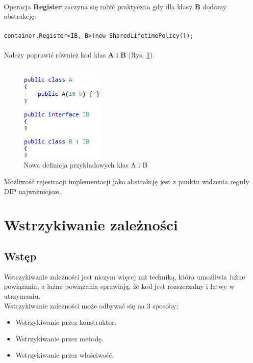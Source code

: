 \documentclass[12pt]{article}
\begin{document}
\\
Operacja \textbf{Register} zaczyna się robić praktyczna gdy dla klasy \textbf{B} dodamy abstrakcję: \\
\\
\texttt{container.Register<IB, B>(new SharedLifetimePolicy());}\\
\\
Należy poprawić również kod klas \textbf{A} i \textbf{B} (Rys. \ref{fig:Example_Container2}). \\ \\
\begin{figure}[H]
	\begin{center}
  		\includegraphics{Example_Container2.png}
  		\caption{Nowa definicja przykładowych klas A i B}
  		\label{fig:Example_Container2}
	\end{center}
\end{figure}
Możliwość rejestracji implementacji jako abstrakcję jest z punktu widzenia reguły DIP najważniejsze.


\clearpage
\section{Wstrzykiwanie zależności}
\subsection{Wstęp}
Wstrzykiwanie zależności jest niczym więcej niż techniką, która umożliwia luźne powiązania, a luźne powiązania sprawiają, że kod jest rozszerzalny i łatwy w utrzymaniu.\cite{dependency_injection}\\
Wstrzykiwanie zależności może odbywać się na 3 sposoby:
\begin{itemize}
	\item Wstrzykiwanie przez konstruktor.
	\item Wstrzykiwanie przez metodę.
	\item Wstrzykiwanie przez właściwość.
\end{itemize}
\end{document}
